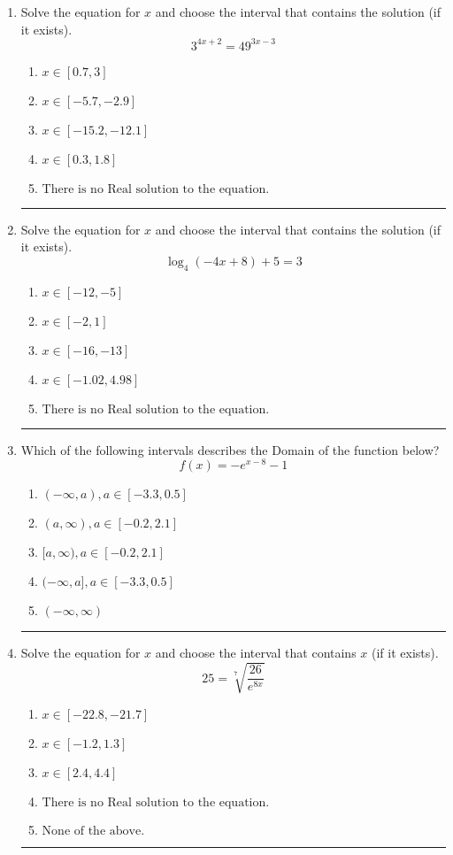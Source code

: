 \documentclass[14pt]{extbook}
\newcommand{\litem}[1]{\item#1\hspace*{-1cm}\rule{\textwidth}{0.4pt}}
\begin{document}
\begin{enumerate}
\litem{
Solve the equation for $x$ and choose the interval that contains the solution (if it exists).\[ 3^{4x+2} = 49^{3x-3} \]\begin{enumerate}[label=\Alph*.]
\item \( x \in [0.7, 3] \)
\item \( x \in [-5.7, -2.9] \)
\item \( x \in [-15.2, -12.1] \)
\item \( x \in [0.3, 1.8] \)
\item \( \text{There is no Real solution to the equation.} \)

\end{enumerate} }
\litem{
Solve the equation for $x$ and choose the interval that contains the solution (if it exists).\[ \log_{4}{(-4x+8)}+5 = 3 \]\begin{enumerate}[label=\Alph*.]
\item \( x \in [-12, -5] \)
\item \( x \in [-2, 1] \)
\item \( x \in [-16, -13] \)
\item \( x \in [-1.02, 4.98] \)
\item \( \text{There is no Real solution to the equation.} \)

\end{enumerate} }
\litem{
Which of the following intervals describes the Domain of the function below?\[ f(x) = -e^{x-8}-1 \]\begin{enumerate}[label=\Alph*.]
\item \( (-\infty, a), a \in [-3.3, 0.5] \)
\item \( (a, \infty), a \in [-0.2, 2.1] \)
\item \( [a, \infty), a \in [-0.2, 2.1] \)
\item \( (-\infty, a], a \in [-3.3, 0.5] \)
\item \( (-\infty, \infty) \)

\end{enumerate} }
\litem{
 Solve the equation for $x$ and choose the interval that contains $x$ (if it exists).\[  25 = \sqrt[7]{\frac{26}{e^{8x}}} \]\begin{enumerate}[label=\Alph*.]
\item \( x \in [-22.8, -21.7] \)
\item \( x \in [-1.2, 1.3] \)
\item \( x \in [2.4, 4.4] \)
\item \( \text{There is no Real solution to the equation.} \)
\item \( \text{None of the above.} \)


\end{enumerate}}
\end{enumerate}
\end{document}
